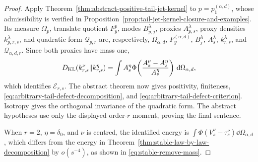 \begin{proof}
Apply Theorem~\ref{thm:abstract-positive-tail-jet-kernel} to
\(p=p_1^{(\alpha,d)}\), whose admissibility is verified in
Proposition~\ref{prop:tail-jet-kernel-closure-and-examples}.  Its measure
\(\Omega_p\), translate quotient \(F_y^p\), modes \(B_{p,j}^\lambda\),
proxies \(A_{p,s}^\lambda\), proxy densities \(k_{p,r,s}^\lambda\), and
quadratic form \(\mathcal Q_{p,r}\) are, respectively,
\(\Omega_{\alpha,d}\), \(F_y^{(\alpha,d)}\), \(B_j^\lambda\),
\(A_s^\lambda\), \(k_{r,s}^\lambda\), and
\(\mathcal Q_{\alpha,d,r}\).  Since both proxies have mass one,
\[
 D_{\rm KL}(k_{r,s}^\nu\|k_{r,s}^\eta)
 =\int A_s^\eta
   \Phi\!\left(\frac{A_s^\nu-A_s^\eta}{A_s^\eta}\right)
   \,\mathrm{d}\Omega_{\alpha,d},
\]
which identifies \(\mathcal E_{r,s}\).  The abstract theorem now gives
positivity, finiteness, \eqref{eq:arbitrary-tail-defect-decomposition}, and
\eqref{eq:arbitrary-tail-defect-criterion}.  Isotropy gives the
orthogonal invariance of the quadratic form.  The abstract hypotheses use
only the displayed order-\(r\) moment, proving the final sentence.

When \(r=2\), \(\eta=\delta_0\), and \(\nu\) is centred, the identified
energy is \(\int\Phi(V_s^\nu-\tau_s^\nu)\dd\Omega_{\alpha,d}\), which differs
from the energy in Theorem~\ref{thm:stable-law-by-law-decomposition} by
\(o(s^{-4})\), as shown in \eqref{eq:stable-remove-mass}.
\end{proof}
